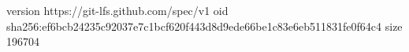 version https://git-lfs.github.com/spec/v1
oid sha256:ef6bcb24235c92037e7c1bcf620f443d8d9ede66be1c83e6eb511831fe0f64c4
size 196704
